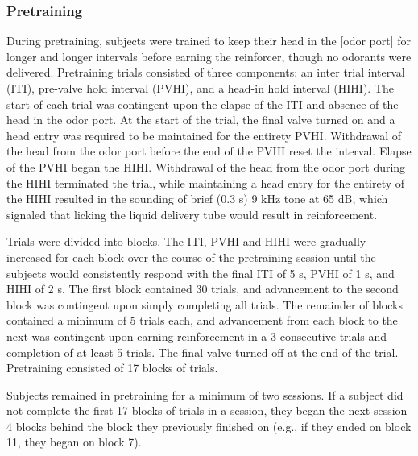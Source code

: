 \subsubsection{Pretraining}
\label{sec:methods_pretraining}
During pretraining, subjects were trained to keep their head in the [odor port] for longer and longer intervals before earning the reinforcer, though no odorants were delivered. Pretraining trials consisted of three components: an inter trial interval (ITI), pre-valve hold interval (PVHI), and a head-in hold interval (HIHI). The start of each trial was contingent upon the elapse of the ITI and absence of the head in the odor port. At the start of the trial, the final valve turned on and a head entry was required to be maintained for the entirety PVHI. Withdrawal of the head from the odor port before the end of the PVHI reset the interval. Elapse of the PVHI began the HIHI. Withdrawal of the head from the odor port during the HIHI terminated the trial, while maintaining a head entry for the entirety of the HIHI resulted in the sounding of brief (0.3 s) 9 kHz tone at 65 dB, which signaled that licking the liquid delivery tube would result in reinforcement.

Trials were divided into blocks. The ITI, PVHI and HIHI were gradually increased for each block over the course of the pretraining session until the subjects would consistently respond with the final ITI of 5 s, PVHI of 1 s, and HIHI of 2 s.  The first block contained 30 trials, and advancement to the second block was contingent upon simply completing all trials. The remainder of blocks contained a minimum of 5 trials each, and advancement from each block to the next was contingent upon earning reinforcement in a 3 consecutive trials and completion of at least 5 trials. The final valve turned off at the end of the trial. Pretraining consisted of 17 blocks of trials.

Subjects remained in pretraining for a minimum of two sessions.  If a subject did not complete the first 17 blocks of trials in a session, they began the next session 4 blocks behind the block they previously finished on (e.g., if they ended on block 11, they began on block 7).

